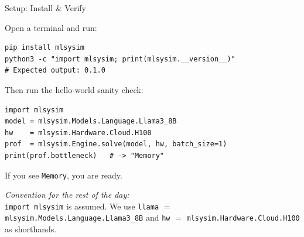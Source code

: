 \documentclass[aspectratio=169, 12pt]{beamer}
\begin{document}
\begin{frame}[fragile,shrink=10]{Setup: Install \& Verify}

\small
Open a terminal and run:

\begin{lstlisting}
pip install mlsysim
python3 -c "import mlsysim; print(mlsysim.__version__)"
# Expected output: 0.1.0
\end{lstlisting}

\vspace{0.3cm}
Then run the hello-world sanity check:

\begin{lstlisting}
import mlsysim
model = mlsysim.Models.Language.Llama3_8B
hw    = mlsysim.Hardware.Cloud.H100
prof  = mlsysim.Engine.solve(model, hw, batch_size=1)
print(prof.bottleneck)   # -> "Memory"
\end{lstlisting}

\vspace{0.2cm}
\centering
\alert{If you see \texttt{Memory}, you are ready.}

\vspace{0.3cm}
\scriptsize
\textit{Convention for the rest of the day:}\\
\texttt{import mlsysim} is assumed.
We use \texttt{llama} $=$ \texttt{mlsysim.Models.Language.Llama3\_8B}
and \texttt{hw} $=$ \texttt{mlsysim.Hardware.Cloud.H100} as shorthands.
\end{frame}
\end{document}

